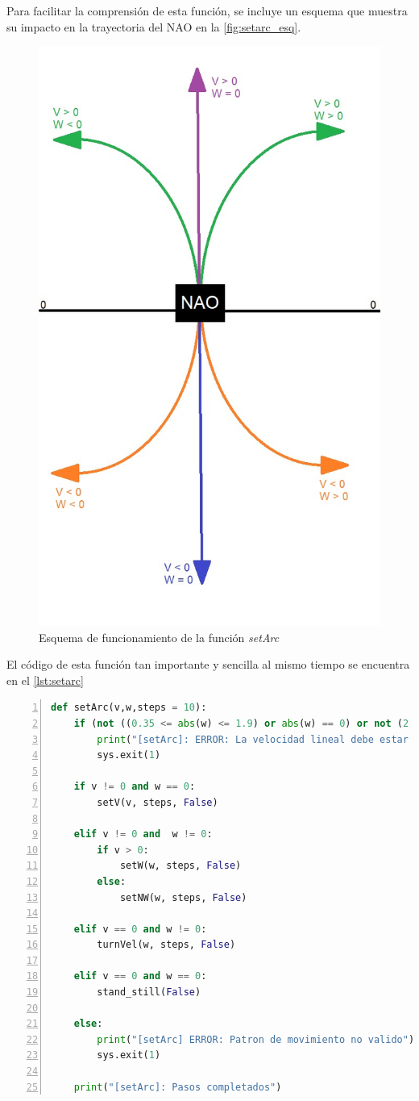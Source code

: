Para facilitar la comprensión de esta función, se incluye un esquema que muestra su impacto en la trayectoria del NAO en la \autoref{fig:setarc_esq}.

\begin{figure}[H]
  \centering
  \includegraphics[height=0.8\textwidth]{figures/cap_4/esquema_movs.jpeg}
  \caption{Esquema de funcionamiento de la función \textit{setArc}}
  \label{fig:setarc_esq}
\end{figure}

El código de esta función tan importante y sencilla al mismo tiempo se encuentra en el \autoref{lst:setarc}
\begin{lstlisting}[language=Python, caption={Función setArc}, label={lst:setarc}, numbers=left, backgroundcolor=\color{gray!10}]    
def setArc(v,w,steps = 10):
    if (not ((0.35 <= abs(w) <= 1.9) or abs(w) == 0) or not (2 <= steps) or (steps%2 != 0)) or (not ((0.35 <= abs(v) <= 4.35) or abs(v) == 0) or not (10 <= steps) or (steps%10 != 0)):
        print("[setArc]: ERROR: La velocidad lineal debe estar entre +-0.35 y +-4.35 y la angular entre +-0.35 y +-1.9, y los pasos deben ser multiplos de 10")
        sys.exit(1)

    if v != 0 and w == 0:
        setV(v, steps, False)

    elif v != 0 and  w != 0:
        if v > 0: 
            setW(w, steps, False)
        else:
            setNW(w, steps, False)
    
    elif v == 0 and w != 0:
        turnVel(w, steps, False)
    
    elif v == 0 and w == 0:
        stand_still(False)

    else:
        print("[setArc] ERROR: Patron de movimiento no valido")
        sys.exit(1)
    
    print("[setArc]: Pasos completados")
\end{lstlisting}

